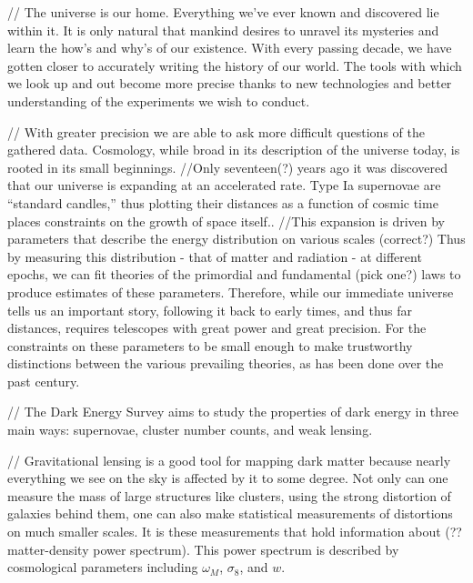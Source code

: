

// The universe is our home. Everything we've ever known and discovered lie within it. It is only natural that mankind desires to unravel its mysteries and learn the how's and why's of our existence. With every passing decade, we have gotten closer to accurately writing the history of our world. The tools with which we look up and out become more precise thanks to new technologies and better understanding of the experiments we wish to conduct.

// With greater precision we are able to ask more difficult questions of the gathered data. Cosmology, while broad in its description of the universe today, is rooted in its small beginnings. %
//Only seventeen(?) years ago it was discovered that our universe is expanding at an accelerated rate. Type Ia supernovae are ``standard candles,'' thus plotting their distances as a function of cosmic time places constraints on the growth of space itself.. %
//This expansion is driven by parameters that describe the energy distribution on various scales (correct?) Thus by measuring this distribution - that of matter and radiation - at different epochs, we can fit theories of the primordial and fundamental (pick one?) laws to produce estimates of these parameters. Therefore, while our immediate universe tells us an important story, following it back to early times, and thus far distances, requires telescopes with great power and great precision. For the constraints on these parameters to be small enough to make trustworthy distinctions between the various prevailing theories, as has been done over the past century. %

// The Dark Energy Survey aims to study the properties of dark energy in three main ways: supernovae, cluster number counts, and weak lensing. %

// Gravitational lensing is a good tool for mapping dark matter because nearly everything we see on the sky is affected by it to some degree. Not only can one measure the mass of large structures like clusters, using the strong distortion of galaxies behind them, one can also make statistical measurements of distortions on much smaller scales. It is these measurements that hold information about (?? matter-density power spectrum). This power spectrum is described by cosmological parameters including $\omega_{M}$, $\sigma_{8}$, and $w$. %


